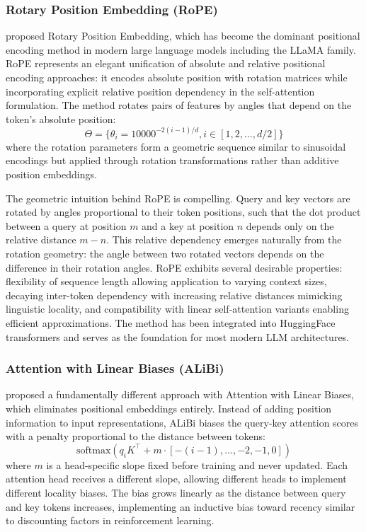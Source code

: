 \subsubsection{Rotary Position Embedding (RoPE)}

\citet{su2024roformer} proposed Rotary Position Embedding, which has become the dominant positional encoding method in modern large language models including the LLaMA family. RoPE represents an elegant unification of absolute and relative positional encoding approaches: it encodes absolute position with rotation matrices while incorporating explicit relative position dependency in the self-attention formulation. The method rotates pairs of features by angles that depend on the token's absolute position:
\begin{equation}
\Theta = \{\theta_i = 10000^{-2(i-1)/d}, i \in [1, 2, \ldots, d/2]\}
\end{equation}
where the rotation parameters form a geometric sequence similar to sinusoidal encodings but applied through rotation transformations rather than additive position embeddings.

The geometric intuition behind RoPE is compelling. Query and key vectors are rotated by angles proportional to their token positions, such that the dot product between a query at position $m$ and a key at position $n$ depends only on the relative distance $m - n$. This relative dependency emerges naturally from the rotation geometry: the angle between two rotated vectors depends on the difference in their rotation angles. RoPE exhibits several desirable properties: flexibility of sequence length allowing application to varying context sizes, decaying inter-token dependency with increasing relative distances mimicking linguistic locality, and compatibility with linear self-attention variants enabling efficient approximations. The method has been integrated into HuggingFace transformers and serves as the foundation for most modern LLM architectures.

\subsubsection{Attention with Linear Biases (ALiBi)}

\citet{press2022train} proposed a fundamentally different approach with Attention with Linear Biases, which eliminates positional embeddings entirely. Instead of adding position information to input representations, ALiBi biases the query-key attention scores with a penalty proportional to the distance between tokens:
\begin{equation}
\text{softmax}\left(q_i K^\top + m \cdot [-(i-1), \ldots, -2, -1, 0]\right)
\end{equation}
where $m$ is a head-specific slope fixed before training and never updated. Each attention head receives a different slope, allowing different heads to implement different locality biases. The bias grows linearly as the distance between query and key tokens increases, implementing an inductive bias toward recency similar to discounting factors in reinforcement learning.

